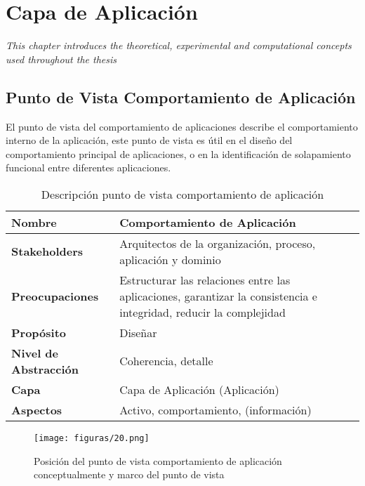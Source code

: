 \chapter{Capa de Aplicación}
\label{chap:Aplicacion}
\textit{This chapter introduces the theoretical, experimental and computational concepts used throughout the thesis}
\vspace{2ex}\vfill
\minitoc
\newpage

\section{Punto de Vista Comportamiento de Aplicación}
El punto de vista del comportamiento de aplicaciones describe el comportamiento interno de la aplicación, este punto de vista es útil en el diseño del comportamiento principal de aplicaciones, o en la identificación de solapamiento funcional entre diferentes aplicaciones.

  \begin{table}[!h]
  	\centering
  	\begin{tabular}{lp{8cm}}
  		\toprule
  		\textbf{Nombre} & \textbf{Comportamiento de Aplicación} \\
  		\midrule
  		\textbf{Stakeholders} & Arquitectos de la organización, proceso, aplicación y dominio \\
  		\textbf{Preocupaciones} & Estructurar las relaciones entre las aplicaciones, garantizar la consistencia e integridad, reducir la complejidad \\
  		\textbf{Propósito} & Diseñar \\
  		\textbf{Nivel de Abstracción} & Coherencia, detalle \\
  		\textbf{Capa} & Capa de Aplicación (Aplicación) \\
  		\textbf{Aspectos} & Activo, comportamiento, (información) \\
  		\bottomrule
  	\end{tabular}
	\captionsetup{width=.95\textwidth}
	\caption{Descripción punto de vista comportamiento de aplicación}
	\label{tabla10}
  \end{table}

  \begin{figure}[!h]
	\centering
	\texttt{[image: figuras/20.png]}
	\captionsetup{width=.95\textwidth}
	\caption{Posición del punto de vista comportamiento de aplicación conceptualmente y marco del punto de vista}
	\label{figura20}
  \end{figure}

